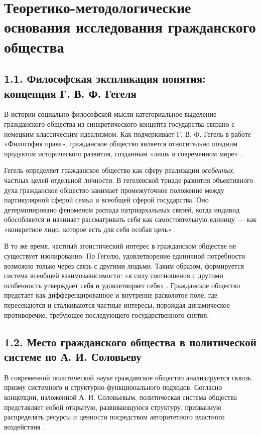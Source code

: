 \newpage

\section{Теоретико-методологические основания исследования гражданского общества}

\subsection{1.1. Философская экспликация понятия: концепция Г. В. Ф. Гегеля}
В истории социально-философской мысли категориальное выделение гражданского общества из синкретического концепта государства связано с немецким классическим идеализмом. Как подчеркивает Г. В. Ф. Гегель в работе «Философия права», гражданское общество является относительно поздним продуктом исторического развития, созданным «лишь в современном мире» \cite{Hegel}. 

Гегель определяет гражданское общество как сферу реализации \textit{особенных}, частных целей отдельной личности. В гегелевской триаде развития объективного духа гражданское общество занимает промежуточное положение между партикулярной сферой семьи и всеобщей сферой государства. Оно детерминировано феноменом распада патриархальных связей, когда индивид обособляется и начинает рассматривать себя как самостоятельную единицу — как «конкретное лицо, которое есть для себя особая цель» \cite{Hegel}.

В то же время, частный эгоистический интерес в гражданском обществе не существует изолированно. По Гегелю, удовлетворение единичной потребности возможно только через связь с другими людьми. Таким образом, формируется система всеобщей взаимозависимости: «в силу соотношения с другими особенность утверждает себя и удовлетворяет себя» \cite{Hegel}. Гражданское общество предстает как дифференцированное и внутренне расколотое поле, где пересекаются и сталкиваются частные интересы, порождая динамическое противоречие, требующее последующего государственного снятия.

\subsection{1.2. Место гражданского общества в политической системе по А. И. Соловьеву}
В современной политической науке гражданское общество анализируется сквозь призму системного и структурно-функционального подходов. Согласно концепции, изложенной А. И. Соловьевым, политическая система общества представляет собой открытую, развивающуюся структуру, призванную распределять ресурсы и ценности посредством авторитетного властного воздействия \cite{Solovyev}.

